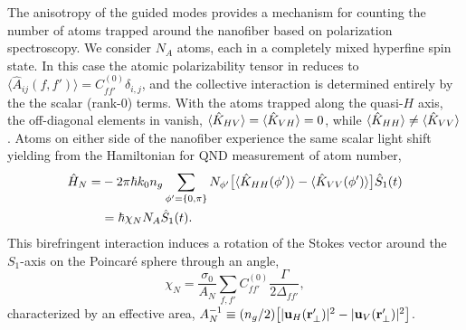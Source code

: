 \documentclass[preprint, aps,pra,onecolumn]{revtex4-1} %
\newcommand{\polcomp}{\hat{K}} %
\newcommand{\chiN}{\chi_{N}}
\newcommand{\Abir}{A_N}
\begin{document}
The anisotropy of the guided modes provides a mechanism for counting the number of atoms trapped around the nanofiber based on polarization spectroscopy.  
We consider $N_A$ atoms, each in a completely mixed hyperfine spin state. In this case the atomic polarizability tensor in  reduces to $\langle \hat{A}_{ij}(f,f') \rangle = C_{ff'}^{(0)} \delta_{i,j}$, and the collective interaction is determined entirely by the the scalar (rank-0) terms.  
With the atoms trapped along the quasi-$H$ axis, the off-diagonal elements in  vanish, $\expt{ \polcomp_{HV} } = \expt{ \polcomp_{VH} } =0$, while $\expt{ \polcomp_{HH} } \neq  \expt{ \polcomp_{VV} }$.  
Atoms on either side of the nanofiber experience the same scalar light shift yielding from   the Hamiltonian for QND measurement of atom number,
	\begin{align}
		\hat{H}_{N} =& -2\pi \hbar k_0 n_g \sum_{\phi' = \{0,\pi \}} N_{\phi'} \big[ \expt{ \polcomp_{HH}(\phi')}  - \expt{ \polcomp_{VV}(\phi')} \big] \hat{S}_1(t)  \nonumber \\
		& =  \hbar \chiN N_A \hat{S}_1(t).  \label{Eq::MixedHamiltonian}
	\end{align}	
This birefringent interaction induces a rotation of the Stokes vector  around the $S_1$-axis on the Poincar\'{e} sphere through an angle, 
	\begin{equation} \label{Eq::RotationAngle}
		\chiN = \frac{\sigma_0}{\Abir}  \sum_{f,f'}  C_{ff'}^{(0)} \frac{\Gamma}{2 \Delta_{ff'}},
	\end{equation}
characterized by an effective area, $\Abir^{-1} \equiv (n_g/2) \big[ |\mathbf{u}_{H}(\br'_\perp)|^2 - |\mathbf{u}_{V}(\br'_\perp)| ^2 \big]$.   
\end{document}
